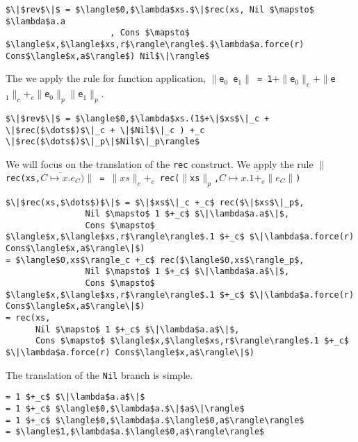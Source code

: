 \documentclass[12pt,letterpaper]{article}
\begin{document}
\begin{lstlisting}
$\|$rev$\|$ = $\langle$0,$\lambda$xs.$\|$rec(xs, Nil $\mapsto$ $\lambda$a.a
                     , Cons $\mapsto$ $\langle$x,$\langle$xs,r$\rangle\rangle$.$\lambda$a.force(r) Cons$\langle$x,a$\rangle$) Nil$\|\rangle$
\end{lstlisting}

The we apply the rule for function application, \texttt{$\|$e$_0$ e$_1\|$ = 1$+\|$e$_0\|_c+\|$e$_1\|_c+_c\|$e$_0\|_p\|$e$_1\|_p$}.
\begin{lstlisting}
$\|$rev$\|$ = $\langle$0,$\lambda$xs.(1$+\|$xs$\|_c + \|$rec($\dots$)$\|_c + \|$Nil$\|_c ) +_c \|$rec($\dots$)$\|_p\|$Nil$\|_p\rangle$
\end{lstlisting}

We will focus on the translation of the \texttt{rec} construct.
We apply the rule \texttt{$\|$rec(xs,$\overline{C \mapsto x.e_C})\|$ = $\|xs\|_c +_c $ rec($\|$xs$\|_p$,$\overline{C \mapsto x.1 +_c \|e_C\|}$) }
\begin{lstlisting}
$\|$rec(xs,$\dots$)$\|$ = $\|$xs$\|_c +_c$ rec($\|$xs$\|_p$,
                Nil $\mapsto$ 1 $+_c$ $\|\lambda$a.a$\|$,
                Cons $\mapsto$ $\langle$x,$\langle$xs,r$\rangle\rangle$.1 $+_c$ $\|\lambda$a.force(r) Cons$\langle$x,a$\rangle\|$)
= $\langle$0,xs$\rangle_c +_c$ rec($\langle$0,xs$\rangle_p$,
                Nil $\mapsto$ 1 $+_c$ $\|\lambda$a.a$\|$,
                Cons $\mapsto$ $\langle$x,$\langle$xs,r$\rangle\rangle$.1 $+_c$ $\|\lambda$a.force(r) Cons$\langle$x,a$\rangle\|$)
= rec(xs,
      Nil $\mapsto$ 1 $+_c$ $\|\lambda$a.a$\|$,
      Cons $\mapsto$ $\langle$x,$\langle$xs,r$\rangle\rangle$.1 $+_c$ $\|\lambda$a.force(r) Cons$\langle$x,a$\rangle\|$)
\end{lstlisting}

The translation of the \texttt{Nil} branch is simple.
\begin{lstlisting}
= 1 $+_c$ $\|\lambda$a.a$\|$
= 1 $+_c$ $\langle$0,$\lambda$a.$\|$a$\|\rangle$
= 1 $+_c$ $\langle$0,$\lambda$a.$\langle$0,a$\rangle\rangle$
= $\langle$1,$\lambda$a.$\langle$0,a$\rangle\rangle$
\end{lstlisting}
\end{document}
